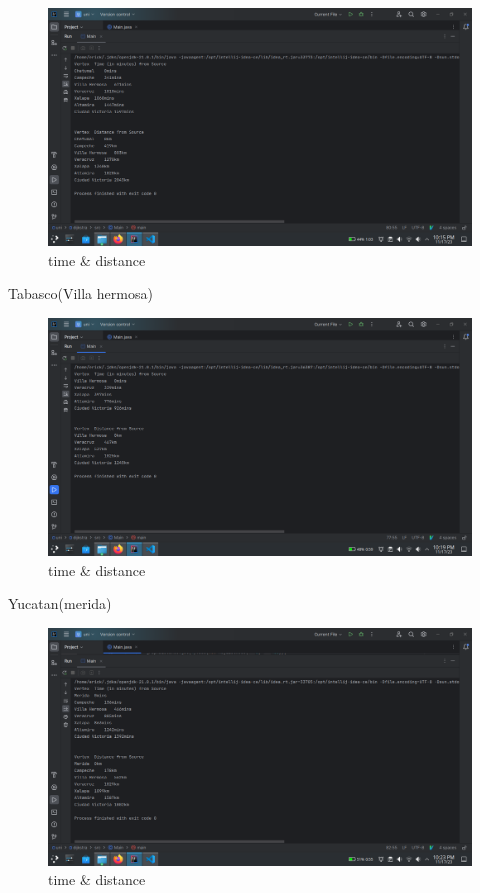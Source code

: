 \documentclass{article}
\begin{document}
\begin{figure}[H]
  \centering
  \includegraphics[scale=0.3]{../imgs/chetu.png}
  \caption{time \& distance}
  \label{fig:11}
\end{figure}
Tabasco(Villa hermosa)

\begin{figure}[H]
  \centering
  \includegraphics[scale=0.3]{../imgs/vh.png}
  \caption{time \& distance}
  \label{fig:12}
\end{figure}
Yucatan(merida)

\begin{figure}[H]
  \centering
  \includegraphics[scale=0.3]{../imgs/merida.png}
  \caption{time \& distance}
  \label{fig:13}
\end{figure}
\end{document}
